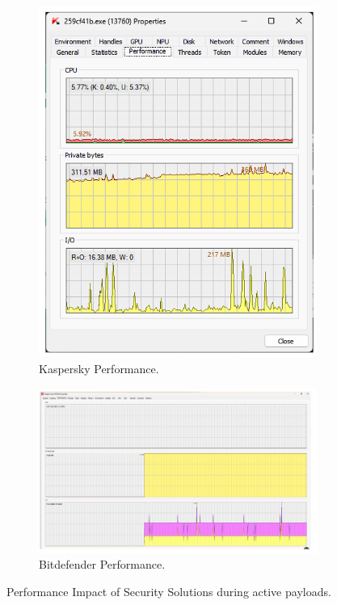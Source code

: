 \documentclass[11pt]{article}
\begin{document}
\begin{figure}[H]
\begin{subfigure}{0.48\linewidth}
			\includegraphics[width=\linewidth]{Pictures/perf_kaspersky.png} %
			\caption{Kaspersky Performance.}
			\label{fig:perf_kaspersky}
		\end{subfigure}
		\vspace{1em}
		\begin{subfigure}{\linewidth}
			\centering
			\includegraphics[width=0.48\linewidth]{Pictures/perf_bitdefender.png} %
			\caption{Bitdefender Performance.}
			\label{fig:perf_bitdefender}
		\end{subfigure}
		\caption{Performance Impact of Security Solutions during active payloads.}
		\label{fig:performanceimpact}
	\end{figure}
	
\end{document}
